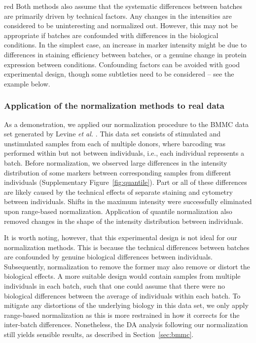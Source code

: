 \documentclass{article}
\begin{document}
\begin{color}{red}
Both methods also assume that the systematic differences between batches are primarily driven by technical factors.
Any changes in the intensities are considered to be uninteresting and normalized out.
However, this may not be appropriate if batches are confounded with differences in the biological conditions.
In the simplest case, an increase in marker intensity might be due to differences in staining efficiency between batches, or a genuine change in protein expression between conditions.
Confounding factors can be avoided with good experimental design, though some subtleties need to be considered -- see the example below.

\subsubsection{Application of the normalization methods to real data}
As a demonstration, we applied our normalization procedure to the BMMC data set generated by Levine \textit{et al.} \cite{levine2015datadriven}.
This data set consists of stimulated and unstimulated samples from each of multiple donors, where barcoding was performed within but not between individuals, i.e., each individual represents a batch.
Before normalization, we observed large differences in the intensity distribution of some markers between corresponding samples from different individuals (Supplementary Figure~\ref{fig:quantile}).
Part or all of these differences are likely caused by the technical effects of separate staining and cytometry between individuals.
Shifts in the maximum intensity were successfully eliminated upon range-based normalization.
Application of quantile normalization also removed changes in the shape of the intensity distribution between individuals.

It is worth noting, however, that this experimental design is not ideal for our normalization methods.
This is because the technical differences between batches are confounded by genuine biological differences between individuals.
Subsequently, normalization to remove the former may also remove or distort the biological effects.
A more suitable design would contain samples from multiple individuals in each batch, such that one could assume that there were no biological differences between the average of individuals within each batch.
To mitigate any distortions of the underlying biology in this data set, we only apply range-based normalization as this is more restrained in how it corrects for the inter-batch differences.
Nonetheless, the DA analysis following our normalization still yields sensible results, as described in Section~\ref{sec:bmmc}.


\end{color}
\end{document}
